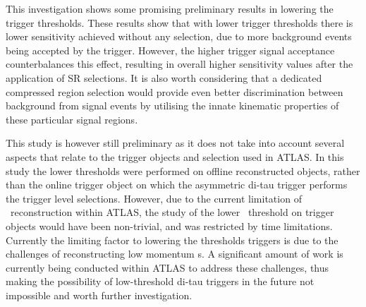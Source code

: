 	This investigation shows some promising preliminary results in lowering the trigger thresholds. 
	These results show that with lower trigger thresholds there is lower sensitivity achieved without any selection, due to more background events being accepted by the trigger. 
	However, the higher trigger signal acceptance counterbalances this effect, resulting in overall higher sensitivity values after the application of \ac{SR} selections.
 	It is also worth considering that a dedicated compressed region selection would provide even better discrimination between background from signal events by utilising the innate kinematic properties of these particular signal regions. 
 	
 	This study is however still preliminary as it does not take into account several aspects that relate to the trigger objects and selection used in \ac{ATLAS}. In this study the lower thresholds were performed on offline reconstructed objects, rather than the online trigger object on which the asymmetric di-tau trigger performs the trigger level selections.
 	 However, due to the current limitation of \htau\ reconstruction within \ac{ATLAS}, the study of the lower \pt\ threshold on trigger objects would have been non-trivial, and was restricted by time limitations. 
 	Currently the limiting factor to lowering the thresholds triggers is due to the challenges of reconstructing low momentum \ltau s.
 	A significant amount of work is currently being conducted within \ac{ATLAS} to address these challenges, thus making the possibility of low-threshold di-tau triggers in the future not impossible and worth further investigation.  
	

